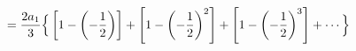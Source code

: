\documentclass[preview]{standalone}
\begin{document}
\begin{align*}
\special{dvisvgm:raw <g id='unique000'>}=\frac{2a_1}{3}\Big\{\left[1-\left(-\frac{1}{2}\right)\right]+\left[1-\left(-\frac{1}{2}\right)^2\right]+\left[1-\left(-\frac{1}{2}\right)^3\right]+\cdots\Big\}\special{dvisvgm:raw </g>}
\end{align*}
\end{document}
